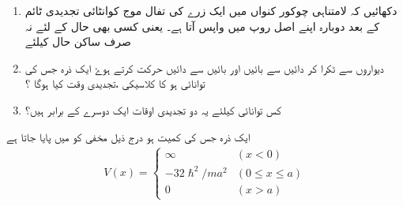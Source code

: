 \begin{enumerate}
\item   
 دکھائیں کہ لامتناہی چوکور کنواں میں ایک زرے کی تفال موج کوانٹائی تجدیدی ٹائم   کے بعد دوبارہ اپنے اصل روپ میں واپس آتا ہے۔  یعنی کسی بھی حال کے لئے نہ صرف ساکن حال کیلئے 
\item   
 دیواروں سے ٹکرا کر دائیں سے بائیں اور بائیں سے دائیں حرکت کرتے ہوۓ ایک ذرہ جس کی توانائی   ہو کا کلاسیکی ،تجدیدی وقت کیا ہوگا ؟ 
\item   
 کس توانائی کیلئے یہ دو تجدیدی اوقات ایک دوسرے کے برابر ہیں؟
\end{enumerate} 
  ایک ذرہ جس کی کمیت  ہو درج ذیل مخفی کو میں پایا جاتا ہے 
\begin{align}
V(x)=
\begin{cases}
\infty & (x< 0)\\
-32\hslash^{2}/ma^{2} & (0\le x \le a)\\
0 & (x> a)
\end{cases}
\end{align}


